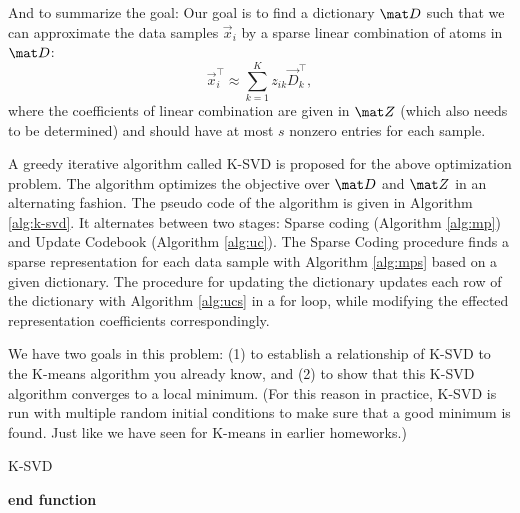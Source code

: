 \documentclass[preview]{standalone}
\begin{document}
And to summarize the goal:
Our goal is to find a dictionary $\mat D$ such that we can 
approximate the data samples $\vec x_i$ by a sparse linear combination of atoms in $\mat D$:
\begin{equation}
\label{eq:x_i}
	\vec x_i^\top \approx \sum_{k=1}^K z_{ik}  \vec D_k^\top,
\end{equation}
where the coefficients of linear combination are given in $\mat Z$
(which also needs to be determined) and
should have at most $s$ nonzero entries for each sample.  

A greedy iterative algorithm called K-SVD is proposed for the above optimization
problem. The algorithm optimizes the objective over $\mat D$ and $\mat Z$
in an alternating fashion. The pseudo code of the algorithm is given in
Algorithm \ref{alg:k-svd}. It alternates between two stages: Sparse coding
(Algorithm \ref{alg:mp}) and Update Codebook (Algorithm
\ref{alg:uc}). The Sparse Coding procedure finds a sparse
representation for each data sample with Algorithm \ref{alg:mps} based on a
given dictionary. The procedure for updating the
dictionary updates each row of the dictionary with Algorithm
\ref{alg:ucs} in a for loop, while modifying the effected
representation coefficients correspondingly.  


We have two goals in this problem: (1) to establish a relationship of K-SVD to
the K-means algorithm you already know, and (2) to show that this K-SVD
algorithm converges to a local minimum. (For this reason in practice,
K-SVD is run with multiple random initial conditions to make sure that
a good minimum is found. Just like we have seen for K-means in earlier
homeworks.)

\begin{algorithm}[H] 
	\caption{K-SVD}
	\label{alg:k-svd}
	\SetAlgoLined
	
	\vspace{1mm}
	\textbf{end function}
	\vspace{2mm}
	\end{algorithm}
\end{document}
